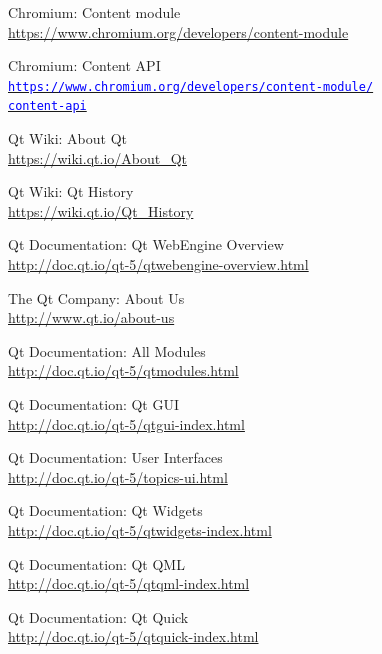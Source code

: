 \documentclass[12pt]{report}
\let\orighref\href
\renewcommand{\href}[2]{%
    \orighref{#1}{\textcolor{blue}{\texttt{#2}}}
}
\let\origurl\url
\renewcommand{\url}[1]{%
    \textcolor{blue}{\origurl{#1}}
}
\begin{document}
\begin{thebibliography}{9}
        Chromium: Content module \\
        \url{https://www.chromium.org/developers/content-module}

        Chromium: Content API \\
        \href{https://www.chromium.org/developers/content-module/content-api}
        {https://www.chromium.org/developers/content-module/\\
        content-api}

        Qt Wiki: About Qt \\
        \url{https://wiki.qt.io/About_Qt}

        Qt Wiki: Qt History \\
        \url{https://wiki.qt.io/Qt_History}

        Qt Documentation: Qt WebEngine Overview \\
        \url{http://doc.qt.io/qt-5/qtwebengine-overview.html}

        The Qt Company: About Us \\
        \url{http://www.qt.io/about-us}

        Qt Documentation: All Modules \\
        \url{http://doc.qt.io/qt-5/qtmodules.html}

        Qt Documentation: Qt GUI \\
        \url{http://doc.qt.io/qt-5/qtgui-index.html}

        Qt Documentation: User Interfaces \\
        \url{http://doc.qt.io/qt-5/topics-ui.html}

        Qt Documentation: Qt Widgets \\
        \url{http://doc.qt.io/qt-5/qtwidgets-index.html}

        Qt Documentation: Qt QML \\
        \url{http://doc.qt.io/qt-5/qtqml-index.html}

        Qt Documentation: Qt Quick \\
        \url{http://doc.qt.io/qt-5/qtquick-index.html}


\end{thebibliography}
\end{document}
